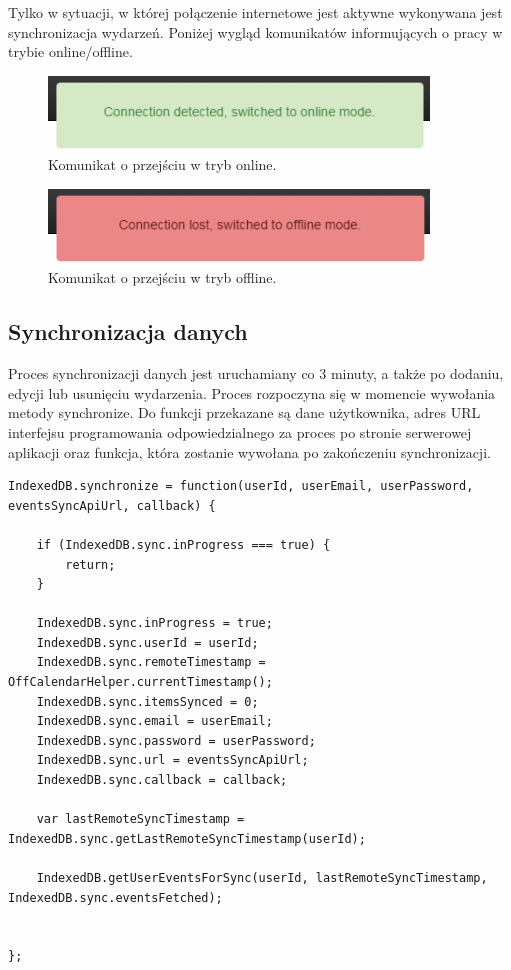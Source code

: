 Tylko w sytuacji, w której połączenie internetowe jest aktywne wykonywana jest synchronizacja wydarzeń. Poniżej wygląd komunikatów informujących o pracy w trybie online/offline.

\begin{figure}[H]
\centering
\includegraphics[width=0.9\textwidth]{isOnline.png}
\caption{Komunikat o przejściu w tryb online.}
\end{figure}

\begin{figure}[H]
\centering
\includegraphics[width=0.9\textwidth]{isOffline.png}
\caption{Komunikat o przejściu w tryb offline.}
\end{figure}

\subsection{Synchronizacja danych}
\label{autSynDanych}

Proces synchronizacji danych jest uruchamiany co 3 minuty, a także po dodaniu, edycji lub usunięciu wydarzenia. Proces rozpoczyna się w momencie wywołania metody synchronize. Do funkcji przekazane są dane użytkownika, adres URL interfejsu programowania odpowiedzialnego za proces po stronie serwerowej aplikacji oraz funkcja, która zostanie wywołana po zakończeniu synchronizacji.

\begin{lstlisting}[caption=Funkcja synchronize rozpoczynająca proces synchronizacji., label=amb, captionpos=b]
IndexedDB.synchronize = function(userId, userEmail, userPassword, eventsSyncApiUrl, callback) {

	if (IndexedDB.sync.inProgress === true) {
    	return;
	}

	IndexedDB.sync.inProgress = true;
	IndexedDB.sync.userId = userId;
	IndexedDB.sync.remoteTimestamp = OffCalendarHelper.currentTimestamp();
	IndexedDB.sync.itemsSynced = 0;
	IndexedDB.sync.email = userEmail;
	IndexedDB.sync.password = userPassword;
	IndexedDB.sync.url = eventsSyncApiUrl;
	IndexedDB.sync.callback = callback;

	var lastRemoteSyncTimestamp = IndexedDB.sync.getLastRemoteSyncTimestamp(userId);

	IndexedDB.getUserEventsForSync(userId, lastRemoteSyncTimestamp, IndexedDB.sync.eventsFetched);


};
\end{lstlisting}

